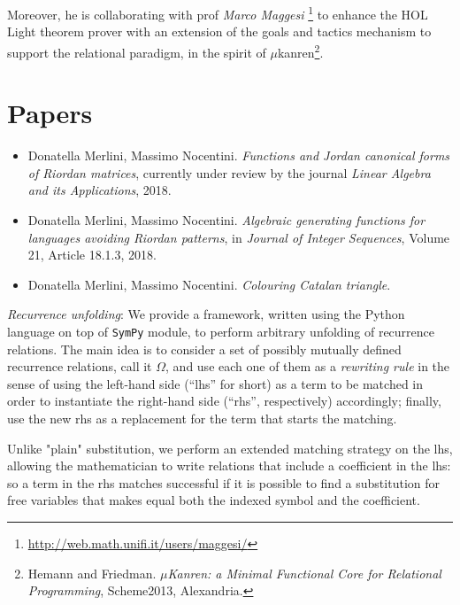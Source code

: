 \documentclass[a4paper]{tufte-handout}
\begin{document}
    Moreover, he is collaborating with prof \textit{Marco Maggesi}
    \footnote{\url{http://web.math.unifi.it/users/maggesi/}} to enhance the HOL
    Light theorem prover with an extension of the goals and tactics mechanism
    to support the relational paradigm, in the spirit of
    $\mu$kanren\footnote{Hemann and Friedman. \textit{$\mu$Kanren: a Minimal Functional
    Core for Relational Programming}, Scheme2013, Alexandria.}.

    \section{Papers}

    \begin{itemize}

        \item Donatella Merlini, Massimo Nocentini. \emph{Functions and Jordan canonical forms of Riordan matrices},
        currently under review by the journal \textit{Linear Algebra and its Applications}, 2018.

        \item Donatella Merlini, Massimo Nocentini. \emph{Algebraic generating functions for languages
            avoiding Riordan patterns}, in \textit{Journal of Integer Sequences}, Volume 21, Article 18.1.3, 2018.

        \item Donatella Merlini, Massimo Nocentini. \emph{Colouring Catalan triangle}.

    \end{itemize}
    
    \iffalse
        \item \emph{Recurrence unfolding}: 
            We provide a framework, written using the Python language
            on top of \texttt{SymPy} module, to perform arbitrary unfolding of recurrence relations. The main idea
            is to consider a set of possibly mutually defined recurrence relations, call it $\Omega$, and use each
            one of them as a \emph{rewriting rule} in the sense of using the left-hand side (``lhs'' for short) 
            as a term to be matched in order to instantiate the right-hand side (``rhs'', respectively) accordingly; 
            finally, use the new rhs as a replacement for the term that starts the matching. 

            Unlike "plain" substitution, we perform an extended matching strategy on the lhs, 
            allowing the mathematician to write relations that include a coefficient in the lhs: so a term in the rhs
            matches successful if it is possible to find a substitution for free variables that makes equal both
            the indexed symbol and the coefficient.
\end{document}

